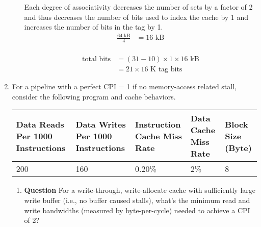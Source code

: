 \documentclass[10pt]{extarticle}
\begin{document}
\begin{enumerate}
\begin{enumerate}
            Each degree of associativity decreases the number of sets by a
            factor of 2 and thus decreases the number of bits used to index the
            cache by 1 and increases the number of bits in the tag by 1.
            \begin{equation*}
                \begin{split}
                    \frac{64 \text{ kB}}{4} & = 16 \text{ kB} \\
                \end{split}
            \end{equation*}

            \begin{equation*}
                \begin{split}
                    \text{total bits} & = (31 - 10) \times 1 \times 16 \text{ kB} \\
                    & = \text{21} \times \text{16 K tag bits}
                \end{split}
            \end{equation*}

        \newpage
        \end{enumerate}

            \item For a pipeline with a perfect CPI = 1 if no memory-access
            related stall, consider the following program and cache behaviors.

            \begin{table}[h]
                \centering
                \begin{tabular}{p{2cm}p{2cm}p{2cm}p{2cm}p{1.5cm}}
                    \textbf{Data Reads Per 1000 Instructions} & \textbf{Data
                    Writes Per 1000 Instructions} & \textbf{Instruction Cache
                    Miss Rate} & \textbf{Data Cache Miss Rate} & \textbf{Block
                    Size (Byte)} \\
                    \hline
                    200 & 160 & 0.20\% & 2\% & 8 \\
                \end{tabular}
            \end{table}

        \begin{enumerate}

            \item \textbf{Question} For a write-through, write-allocate cache
            with sufficiently large write buffer (i.e., no buffer caused
            stalls), what’s the minimum read and write bandwidths (measured by
            byte-per-cycle) needed to achieve a CPI of 2?


\end{enumerate}
\end{enumerate}
\end{document}
